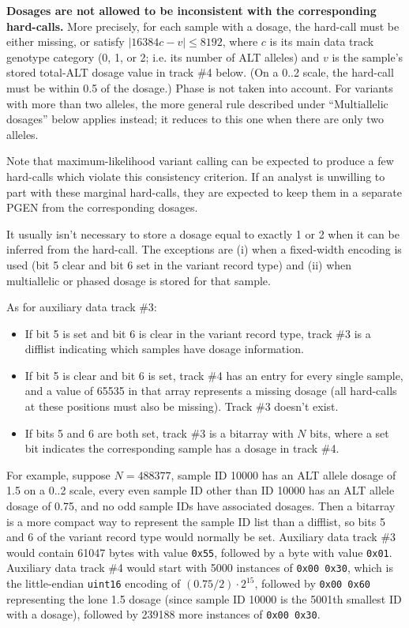 \documentclass[8pt]{article}
\begin{document}
\textbf{Dosages are not allowed to be inconsistent with the corresponding
hard-calls.}  More precisely, for each sample with a dosage, the hard-call
must be either missing, or satisfy $|16384c - v|\leq 8192$, where $c$ is its
main data track genotype category (0, 1, or 2; i.e. its number of ALT alleles)
and $v$ is the sample's stored total-ALT dosage value in track \#4 below.  (On
a 0..2 scale, the hard-call must be within 0.5 of the dosage.)  Phase is not
taken into account.  For variants with more than two alleles, the more general
rule described under ``Multiallelic dosages'' below applies instead; it
reduces to this one when there are only two alleles.

Note that maximum-likelihood variant calling can be expected to produce a few
hard-calls which violate this consistency criterion.  If an analyst is unwilling to part with these marginal hard-calls,
they are expected to keep them in a separate PGEN from the corresponding
dosages.

It usually isn't necessary to store a dosage equal to exactly 1 or 2 when it
can be inferred from the hard-call.  The exceptions are (i) when a fixed-width
encoding is used (bit 5 clear and bit 6 set in the variant record type) and
(ii) when multiallelic or phased dosage is stored for that sample.

As for auxiliary data track \#3:

\begin{itemize}
\item If bit 5 is set and bit 6 is clear in the variant record type, track \#3
  is a difflist indicating which samples have dosage information.
\item If bit 5 is clear and bit 6 is set, track \#4 has an entry for every
  single sample, and a value of 65535 in that array represents a missing
  dosage (all hard-calls at these positions must also be missing).  Track \#3
  doesn't exist.
\item If bits 5 and 6 are both set, track \#3 is a bitarray with $N$ bits,
  where a set bit indicates the corresponding sample has a dosage in track \#4.
\end{itemize}

For example, suppose $N=488377$, sample ID 10000 has an ALT allele dosage of
1.5 on a 0..2 scale, every even sample ID other than ID 10000 has an ALT allele
dosage of 0.75, and no odd sample IDs have associated dosages.  Then a bitarray
is a more compact way to represent the sample ID list than a difflist, so bits
5 and 6 of the variant record type would normally be set.  Auxiliary data track
\#3 would contain 61047 bytes with value \texttt{0x55}, followed by a byte with
value \texttt{0x01}.  Auxiliary data track \#4 would start with 5000 instances
of \texttt{0x00 0x30}, which is the little-endian \texttt{uint16} encoding of
$(0.75/2)\cdot 2^{15}$, followed by \texttt{0x00 0x60} representing the lone
1.5 dosage (since sample ID 10000 is the 5001th smallest ID with a dosage),
followed by 239188 more instances of \texttt{0x00 0x30}.
\end{document}
